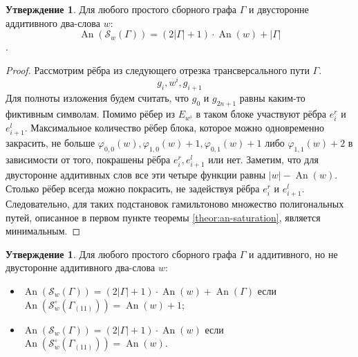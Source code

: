 \documentclass{article}
\theoremstyle{definition}
\newtheorem{conjecture}[theorem]{Утверждение}
\newcommand{\An}{\operatorname{An}}
\begin{document}
\begin{conjecture}
    Для любого простого сборного графа $\Gamma$ и двусторонне аддитивного два-слова $w$:
    \[\An(\mathcal{S}_w(\Gamma)) = (2|\Gamma| + 1) \cdot \An(w) + |\Gamma|\].
\end{conjecture}
\begin{proof}
    Рассмотрим рёбра из следующего отрезка трансверсального пути $\Gamma$.
    \[
        g_i, w^i, g_{i + 1}
    \]
    Для полноты изложения будем считать, что $g_0$ и $g_{2n + 1}$ равны каким-то фиктивным символам. Помимо рёбер из $E_{w^i}$ в таком блоке участвуют рёбра $e_i^r$ и $e_{i + 1}^l$. Максимальное количество рёбер блока, которое можно одновременно закрасить, не больше $\varphi_{0,0}(w), \varphi_{1,0}(w) + 1, \varphi_{0,1}(w) + 1$ либо $\varphi_{1,1}(w) + 2$ в зависимости от того, покрашены рёбра $e_i^r, e_{i + 1}^l$ или нет. Заметим, что для двусторонне аддитивных слов все эти четыре функции равны $|w| - \An(w)$. Столько рёбер всегда можно покрасить, не задействуя рёбра $e_i^r$ и $e_{i + 1}^l$. Следовательно, для таких подстановок гамильтоново множество полигональных путей, описанное в первом пункте теоремы \ref{theor:an-saturation}, является минимальным.
\end{proof}

\begin{conjecture}
    Для любого простого сборного графа $\Gamma$ и аддитивного, но не двусторонне аддитивного два-слова $w$:
    \begin{itemize}
        \item $\An(\mathcal{S}_w(\Gamma)) = (2|\Gamma| + 1) \cdot \An(w) + \An(\Gamma)$ если $\An(\mathcal{S}_w^\circ(\Gamma_{(11)})) = \An(w) + 1$;
        \item $\An(\mathcal{S}_w(\Gamma)) = (2|\Gamma| + 1) \cdot \An(w)$ если $\An(\mathcal{S}_w^\circ(\Gamma_{(11)})) = \An(w)$.
    \end{itemize}
\end{conjecture}
\end{document}
